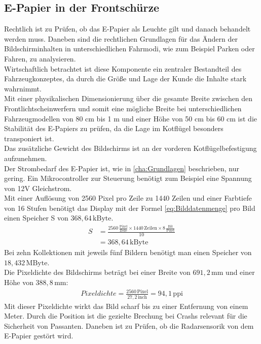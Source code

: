 \subsection{E-Papier in der Frontschürze}
Rechtlich ist zu Prüfen, ob das E-Papier als Leuchte gilt und danach behandelt werden muss. Daneben sind die rechtlichen Grundlagen für das Ändern der Bildschirminhalten in unterschiedlichen Fahrmodi, wie zum Beispiel Parken oder Fahren, zu analysieren. \\
Wirtschaftlich betrachtet ist diese Komponente ein zentraler Bestandteil des Fahrzeugkonzeptes, da durch die Größe und Lage der Kunde die Inhalte stark wahrnimmt. \\
Mit einer physikalischen Dimensionierung über die gesamte Breite zwischen den Frontlichtscheinwerfern und somit eine mögliche Breite bei unterschiedlichen Fahrzeugmodellen von 80 cm bis 1 m und einer Höhe von 50 cm bis 60 cm ist die Stabilität des E-Papiers zu prüfen, da die Lage im Kotflügel besonders transponiert ist. \\ 
Das zusätzliche Gewicht des Bildschirms ist an der vorderen Kotflügelbefestigung aufzunehmen.\\
Der Strombedarf des E-Papier ist, wie in \ref{cha:Grundlagen} beschrieben, nur gering. Ein Mikrocontroller zur Steuerung benötigt zum Beispiel eine Spannung von 12V Gleichstrom. \\
Mit einer Auflösung von 2560 Pixel pro Zeile zu 1440 Zeilen und einer Farbtiefe von 16 Stufen benötigt das Display mit der Formel \ref{eq:Bilddatenmenge} pro Bild einen Speicher S von $ 368,64\,\mathrm{kByte} $. 
\begin{align}
	S &= \frac{2560\,\frac{\mathrm{Pixel}}{\mathrm{Zeile}}\times 1440\,\mathrm{Zeilen} \times 8\,\frac{\mathrm{Bit}}{\mathrm{Pixel}}}{10} \\
	&=  368,64\,\mathrm{kByte}
\end{align}
Bei zehn Kollektionen mit jeweils fünf Bildern benötigt man einen Speicher von $ 18,432\,\mathrm{MByte} $. \\
Die Pixeldichte des Bildschirms beträgt bei einer Breite von $ 691,2\,\mathrm{mm} $ und einer Höhe von $ 388,8\,\mathrm{mm} $:
\begin{align}
	Pixeldichte = \frac{2560\,\mathrm{Pixel}}{27,2\,\mathrm{inch}} = 94,1\,\mathrm{ppi}
\end{align}
Mit dieser Pixeldichte wirkt das Bild scharf bis zu einer Entfernung von einem Meter.
Durch die Position ist die gezielte Brechung bei Crashs relevant für die Sicherheit von Passanten.
Daneben ist zu Prüfen, ob die Radarsensorik von dem E-Papier gestört wird.\\
